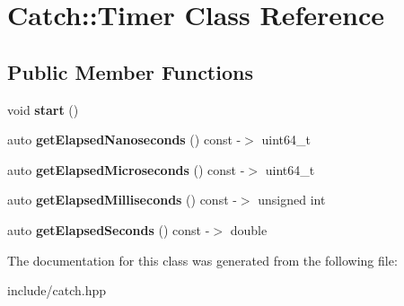 \hypertarget{classCatch_1_1Timer}{}\section{Catch\+:\+:Timer Class Reference}
\label{classCatch_1_1Timer}
\subsection*{Public Member Functions}
\begin{DoxyCompactItemize}
\item 
void {\bfseries start} ()\hypertarget{classCatch_1_1Timer_a0a56e879e43f36c102bf9ea8b5fc8b72}{}\label{classCatch_1_1Timer_a0a56e879e43f36c102bf9ea8b5fc8b72}

\item 
auto {\bfseries get\+Elapsed\+Nanoseconds} () const -\/$>$ uint64\+\_\+t\hypertarget{classCatch_1_1Timer_a57be5d17ca868a2d6fb1eea84de665cf}{}\label{classCatch_1_1Timer_a57be5d17ca868a2d6fb1eea84de665cf}

\item 
auto {\bfseries get\+Elapsed\+Microseconds} () const -\/$>$ uint64\+\_\+t\hypertarget{classCatch_1_1Timer_a545de17a61a6fee1dbe3de5b0723e5fa}{}\label{classCatch_1_1Timer_a545de17a61a6fee1dbe3de5b0723e5fa}

\item 
auto {\bfseries get\+Elapsed\+Milliseconds} () const -\/$>$ unsigned int\hypertarget{classCatch_1_1Timer_a30aaf458dbb59dd8ac8971c9c62e0eac}{}\label{classCatch_1_1Timer_a30aaf458dbb59dd8ac8971c9c62e0eac}

\item 
auto {\bfseries get\+Elapsed\+Seconds} () const -\/$>$ double\hypertarget{classCatch_1_1Timer_a065e37e3c9eb16bd4dcf41971d8deedc}{}\label{classCatch_1_1Timer_a065e37e3c9eb16bd4dcf41971d8deedc}

\end{DoxyCompactItemize}


The documentation for this class was generated from the following file\+:\begin{DoxyCompactItemize}
\item 
include/catch.\+hpp\end{DoxyCompactItemize}
